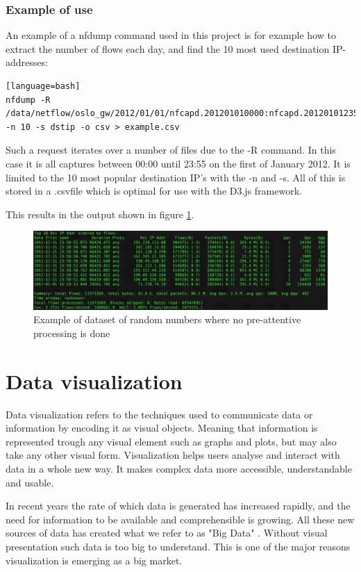 \subsubsection{Example of use}
An example of a nfdump command used in this project is for example how to extract the number of flows each day, and find the 10 most used destination IP-addresses:

\begin{lstlisting}[caption={nfdump example},label={lst:nfdumo}][language=bash]
nfdump -R /data/netflow/oslo_gw/2012/01/01/nfcapd.201201010000:nfcapd.201201012355 -n 10 -s dstip -o csv > example.csv
\end{lstlisting}

Such a request iterates over a number of files due to the -R command. In this case it is all captures between 00:00 until 23:55 on the first of January 2012. It is limited to the 10 most popular destination IP's with the -n and -s. All of this is stored in a .\gls{csv}file which is optimal for use with the D3.js framework. 

This results in the output shown in figure \ref{top10example}.

\begin{figure}[h!]
\includegraphics[scale=0.4]{top10example}
\caption{Example of dataset of random numbers where no pre-attentive processing is done}
\label{top10example}
\end{figure}



\section{Data visualization}
\label{sec:dataviz}
Data visualization refers to the techniques used to communicate data or information by encoding it as visual objects. Meaning that information is represented trough any visual element such as graphs and plots, but may also take any other visual form. Visualization helps users analyse and interact with data in a whole new way. It makes complex data more accessible, understandable and usable.\cite{friedman}

In recent years the rate of which data is generated has increased rapidly, and the need for information to be available and comprehensible is growing. All these new sources of data has created what we refer to as "Big Data" \cite{bigdata}. Without visual presentation such data is too big to understand. This is one of the major reasons visualization is emerging as a big market. 

